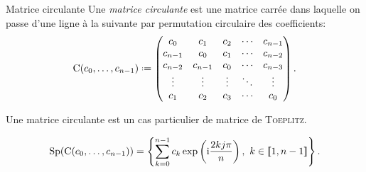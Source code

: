 \begin{defi}{Matrice circulante}
Une \emph{matrice circulante} est une matrice carrée dans laquelle on passe d'une ligne à la suivante par permutation circulaire des coefficients:
$$
\mathrm{C}(c_0, \dots, c_{n-1}) \defeq
\begin{pmatrix}
c_0 & c_1 & c_2 & \cdots & c_{n-1} \\
c_{n-1} & c_0 & c_1 & \cdots & c_{n-2} \\
c_{n-2} & c_{n-1} & c_0 & \cdots & c_{n-3} \\
\vdots & \vdots & \vdots & \ddots & \vdots \\
c_1 & c_2 & c_3 & \cdots & c_0
\end{pmatrix}.
$$
\end{defi}

\begin{remarque}
    Une matrice circulante est un cas particulier de matrice de \textsc{Toeplitz}.
\end{remarque}

\begin{prop}
    $$\mathrm{Sp}(\mathrm{C}(c_0, \dots, c_{n-1})) = \left \{ \sum_{k=0}^{n-1} c_k \exp \left( \mathrm{i} \frac{2kj \pi}{n} \right),\ k \in \llbracket 1, n-1 \rrbracket \right \}.$$
\end{prop}

